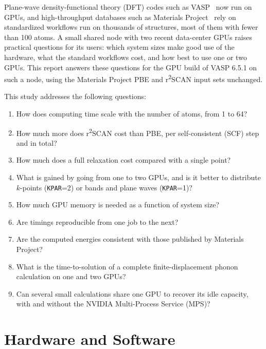 \documentclass[11pt,letterpaper]{article}
\begin{document}
Plane-wave density-functional theory (DFT) codes such as VASP~\cite{Kresse1996} now run on
GPUs, and high-throughput databases such as Materials Project~\cite{Jain2013} rely on
standardized workflows run on thousands of structures, most of them with fewer than 100 atoms.
A small shared node with two recent data-center GPUs raises practical questions for its users:
which system sizes make good use of the hardware, what the standard workflows cost, and how best
to use one or two GPUs. This report answers these questions for the GPU build of VASP 6.5.1 on
such a node, using the Materials Project PBE and r\textsuperscript{2}SCAN input sets unchanged.

This study addresses the following questions:
\begin{enumerate}
  \item How does computing time scale with the number of atoms, from 1 to 64?
  \item How much more does r\textsuperscript{2}SCAN cost than PBE, per self-consistent (SCF)
        step and in total?
  \item How much does a full relaxation cost compared with a single point?
  \item What is gained by going from one to two GPUs, and is it better to distribute
        $k$-points (\texttt{KPAR}=2) or bands and plane waves (\texttt{KPAR}=1)?
  \item How much GPU memory is needed as a function of system size?
  \item Are timings reproducible from one job to the next?
  \item Are the computed energies consistent with those published by Materials Project?
  \item What is the time-to-solution of a complete finite-displacement phonon calculation on one
        and two GPUs?
  \item Can several small calculations share one GPU to recover its idle capacity, with and
        without the NVIDIA Multi-Process Service (MPS)?
\end{enumerate}

\section{Hardware and Software}
\label{sec:hardware}
\end{document}
